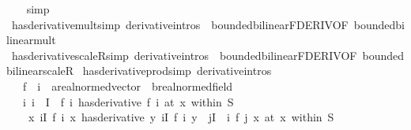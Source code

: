 \begin{isabellebody}
\isanewline
\ \ \isamarkupfalse%
\ simp\isanewline
{}\isamarkupfalse%
%
\endisatagproof
{\isafoldproof}%
%
\isadelimproof
\isanewline
%
\endisadelimproof
\isanewline
{}\isamarkupfalse%
\ has{\isacharunderscore}{\kern0pt}derivative{\isacharunderscore}{\kern0pt}mult{\isacharbrackleft}{\kern0pt}simp{\isacharcomma}{\kern0pt}\ derivative{\isacharunderscore}{\kern0pt}intros{\isacharbrackright}{\kern0pt}\ {\isacharequal}{\kern0pt}\ bounded{\isacharunderscore}{\kern0pt}bilinear{\isachardot}{\kern0pt}FDERIV{\isacharbrackleft}{\kern0pt}OF\ bounded{\isacharunderscore}{\kern0pt}bilinear{\isacharunderscore}{\kern0pt}mult{\isacharbrackright}{\kern0pt}\isanewline
{}\isamarkupfalse%
\ has{\isacharunderscore}{\kern0pt}derivative{\isacharunderscore}{\kern0pt}scaleR{\isacharbrackleft}{\kern0pt}simp{\isacharcomma}{\kern0pt}\ derivative{\isacharunderscore}{\kern0pt}intros{\isacharbrackright}{\kern0pt}\ {\isacharequal}{\kern0pt}\ bounded{\isacharunderscore}{\kern0pt}bilinear{\isachardot}{\kern0pt}FDERIV{\isacharbrackleft}{\kern0pt}OF\ bounded{\isacharunderscore}{\kern0pt}bilinear{\isacharunderscore}{\kern0pt}scaleR{\isacharbrackright}{\kern0pt}\isanewline
\isanewline
{}\isamarkupfalse%
\ has{\isacharunderscore}{\kern0pt}derivative{\isacharunderscore}{\kern0pt}prod{\isacharbrackleft}{\kern0pt}simp{\isacharcomma}{\kern0pt}\ derivative{\isacharunderscore}{\kern0pt}intros{\isacharbrackright}{\kern0pt}{\isacharcolon}{\kern0pt}\isanewline
\ \ \ f\ {\isacharcolon}{\kern0pt}{\isacharcolon}{\kern0pt}\ {\isachardoublequoteopen}{\isacharprime}{\kern0pt}i\ {\isasymRightarrow}\ {\isacharprime}{\kern0pt}a{\isacharcolon}{\kern0pt}{\isacharcolon}{\kern0pt}real{\isacharunderscore}{\kern0pt}normed{\isacharunderscore}{\kern0pt}vector\ {\isasymRightarrow}\ {\isacharprime}{\kern0pt}b{\isacharcolon}{\kern0pt}{\isacharcolon}{\kern0pt}real{\isacharunderscore}{\kern0pt}normed{\isacharunderscore}{\kern0pt}field{\isachardoublequoteclose}\isanewline
\ \ \ {\isachardoublequoteopen}{\isacharparenleft}{\kern0pt}{\isasymAnd}i{\isachardot}{\kern0pt}\ i\ {\isasymin}\ I\ {\isasymLongrightarrow}\ {\isacharparenleft}{\kern0pt}f\ i\ has{\isacharunderscore}{\kern0pt}derivative\ f{\isacharprime}{\kern0pt}\ i{\isacharparenright}{\kern0pt}\ {\isacharparenleft}{\kern0pt}at\ x\ within\ S{\isacharparenright}{\kern0pt}{\isacharparenright}{\kern0pt}\ {\isasymLongrightarrow}\isanewline
\ \ \ \ {\isacharparenleft}{\kern0pt}{\isacharparenleft}{\kern0pt}{\isasymlambda}x{\isachardot}{\kern0pt}\ {\isasymProd}i{\isasymin}I{\isachardot}{\kern0pt}\ f\ i\ x{\isacharparenright}{\kern0pt}\ has{\isacharunderscore}{\kern0pt}derivative\ {\isacharparenleft}{\kern0pt}{\isasymlambda}y{\isachardot}{\kern0pt}\ {\isasymSum}i{\isasymin}I{\isachardot}{\kern0pt}\ f{\isacharprime}{\kern0pt}\ i\ y\ {\isacharasterisk}{\kern0pt}\ {\isacharparenleft}{\kern0pt}{\isasymProd}j{\isasymin}I\ {\isacharminus}{\kern0pt}\ {\isacharbraceleft}{\kern0pt}i{\isacharbraceright}{\kern0pt}{\isachardot}{\kern0pt}\ f\ j\ x{\isacharparenright}{\kern0pt}{\isacharparenright}{\kern0pt}{\isacharparenright}{\kern0pt}\ {\isacharparenleft}{\kern0pt}at\ x\ within\ S{\isacharparenright}{\kern0pt}{\isachardoublequoteclose}\isanewline

\end{isabellebody}
